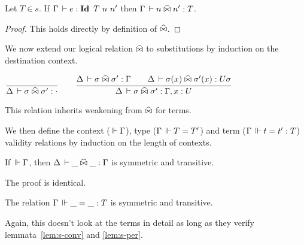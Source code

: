 \documentclass[a4paper,english]{lipics-utf8x}
\begin{document}
  \begin{lemma}
    Let $T \in s$.
    If $\Gamma \,\vdash e : \operatorname{\mathbf{Id}~} T\ n\ n'$ then $\Gamma \,\vdash n \mathrel{\widehat{\bowtie}} n' : T$.
  \end{lemma}

  \begin{proof}
    This holds directly by definition of $\mathrel{\widehat{\bowtie}}$.
  \end{proof}


  We now extend our logical relation $\mathrel{\widehat{\bowtie}}$ to substitutions by
  induction on the destination context.
  \begin{center}
  \(
    \ru{}{\Delta \der \sigma \hEr \sigma' : \cdot}
    \qquad
    \ru{\Delta \der \sigma \hEr \sigma' : \Gamma \qquad
        \Delta \der \sigma(x) \hEr \sigma'(x) : U \sigma
      }{\Delta \der \sigma \hEr \sigma' : \Gamma, x:U}
  \)
  \end{center}
  This relation inherits weakening from $\mathrel{\widehat{\bowtie}}$ for terms.

  We then define the context ($\,\Vdash \Gamma$), type ($\Gamma \,\Vdash T = T'$) and
  term ($\Gamma \,\Vdash t = t' : T$) validity relations by induction on the length
  of contexts.

  \begin{mathc}
    \ru{}{\Der \cdot}
    \qquad
    \qquad
    \qquad
  \end{mathc}

  \begin{mathc}
    \qquad
  \end{mathc}

  \begin{lemma}
    If $\,\Vdash \Gamma$, then $\Delta \,\vdash \_ \mathrel{\widehat{\bowtie}} \_ : \Gamma$ is symmetric and
    transitive.
  \end{lemma}
  The proof is identical.

  \begin{lemma}
    The relation $\Gamma \,\Vdash \_ = \_ : T$ is symmetric and transitive.
  \end{lemma}
  Again, this doesn't look at the terms in detail as long as they verify
  lemmata~\ref{lem:s-conv} and \ref{lem:s-per}.
\end{document}
